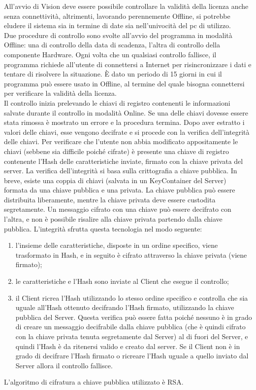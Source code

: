 All'avvio di Vision deve essere possibile controllare la validità della licenza anche senza connettività, altrimenti, lavorando perennemente Offline, si potrebbe eludere il sistema sia in termine di date sia nell'univocità del pc di utilizzo.\\
Due procedure di controllo sono svolte all'avvio del programma in modalità Offline: una di controllo della data di scadenza, l'altra di controllo della componente Hardware. Ogni volta che un qualsiasi controllo fallisce, il programma richiede all'utente di connettersi a Internet per risincronizzare i dati e tentare di risolvere la situazione. È dato un periodo di 15 giorni in cui il programma può essere usato in Offline, al termine del quale bisogna connettersi per verificare la validità della licenza.\\
Il controllo inizia prelevando le chiavi di registro contenenti le informazioni salvate durante il controllo in modalità Online. Se una delle chiavi dovesse essere stata rimossa è mostrato un errore e la procedura termina. Dopo aver estratto i valori delle chiavi, esse vengono decifrate e si procede con la verifica dell’integrità delle chiavi. Per verificare che l’utente non abbia modificato appositamente le chiavi (sebbene sia difficile poiché cifrate) è presente una chiave di registro contenente l’Hash delle caratteristiche inviate, firmato con la chiave privata del server.
La verifica dell'integrità si basa sulla crittografia a chiave pubblica. In breve, esiste una coppia di chiavi (salvata in un \gls{KeyContainer} del Server) formata da una chiave pubblica e una privata. La chiave pubblica può essere distribuita liberamente, mentre la chiave privata deve essere custodita segretamente. Un messaggio cifrato con una chiave può essere decifrato con l'altra, e non è possibile risalire alla chiave privata partendo dalla chiave pubblica. L'integrità sfrutta questa tecnologia nel modo seguente:
\begin{enumerate}
\item l'insieme delle caratteristiche, disposte in un ordine specifico, viene trasformato in Hash, e in seguito è cifrato attraverso la chiave privata (viene firmato);
\item le caratteristiche e l'Hash sono inviate al Client che esegue il controllo;
\item il Client ricrea l'Hash utilizzando lo stesso ordine specifico e controlla che sia uguale all'Hash ottenuto decifrando l'Hash firmato, utilizzando la chiave pubblica del Server. Questa verifica può essere fatta poiché nessuno è in grado di creare un messaggio decifrabile dalla chiave pubblica (che è quindi cifrato con la chiave privata tenuta segretamente dal Server) al di fuori del Server, e quindi l'Hash è da ritenersi valido e creato dal server. Se il Client non è in grado di decifrare l'Hash firmato o ricreare l'Hash uguale a quello inviato dal Server allora il controllo fallisce.
\end{enumerate}
L'algoritmo di cifratura a chiave pubblica utilizzato è \gls{RSA}.

